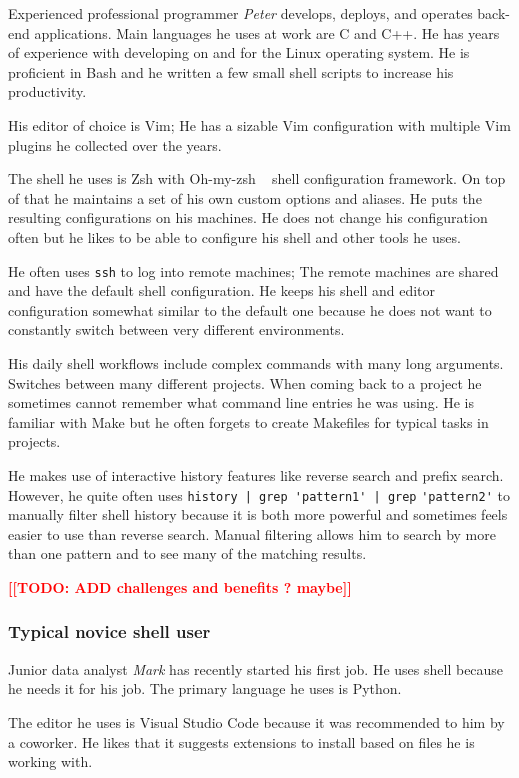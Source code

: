 \documentclass[thesis=M,english]{FITthesis}[2012/10/20]
\newcommand{\todotext}[1]{\textcolor{red}{\textbf{[[#1]]}}}
\let\myCite\cite
\renewcommand\cite{\unskip~\myCite}
\begin{document}
Experienced professional programmer \textit{Peter} develops, deploys, and operates back-end applications. Main languages he uses at work are C and C++. He has years of experience with developing on and for the Linux operating system. He is proficient in Bash and he written a few small shell scripts to increase his productivity.

His editor of choice is Vim; He has a sizable Vim configuration with multiple Vim plugins he collected over the years.

The shell he uses is Zsh with Oh-my-zsh \cite{toolsohmyzsh} shell configuration framework. On top of that he maintains a set of his own custom options and aliases. He puts the resulting configurations on his machines. He does not change his configuration often but he likes to be able to configure his shell and other tools he uses.

He often uses \verb|ssh| to log into remote machines; The remote machines are shared and have the default shell configuration. He keeps his shell and editor configuration somewhat similar to the default one because he does not want to constantly switch between very different environments. 

His daily shell workflows include complex commands with many long arguments. Switches between many different projects. When coming back to a project he sometimes cannot remember what command line entries he was using. He is familiar with Make but he often forgets to create Makefiles for typical tasks in projects.

He makes use of interactive history features like reverse search and prefix search. However, he quite often uses \verb#history | grep 'pattern1' | grep# \verb#'pattern2'# to manually filter shell history because it is both more powerful and sometimes feels easier to use than reverse search. Manual filtering allows him to search by more than one pattern and to see many of the matching results. 

\todotext{TODO: ADD challenges and benefits ? maybe}

\subsubsection*{Typical novice shell user}

Junior data analyst \textit{Mark} has recently started his first job. He uses shell because he needs it for his job. The primary language he uses is Python. 

The editor he uses is Visual Studio Code because it was recommended to him by a coworker. He likes that it suggests extensions to install based on files he is working with.
\end{document}
